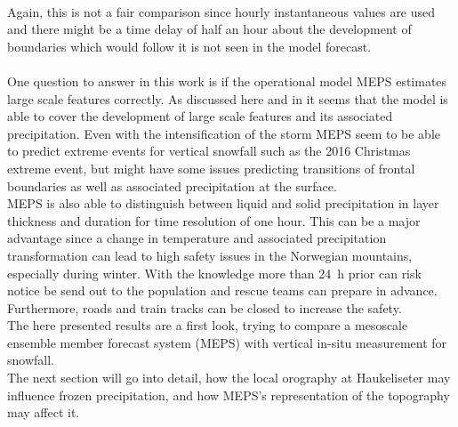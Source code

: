 \\
Again, this is not a fair comparison since hourly instantaneous values are used and there might be a time delay of half an hour about the development of boundaries which would follow it is not seen in the model forecast. 
\\
\\
One question to answer in this work is if the operational model MEPS estimates large scale features correctly. As discussed here and in  it seems that the model is able to cover the development of large scale features and its associated precipitation. Even with the intensification of the storm MEPS seem to be able to predict extreme events for vertical snowfall such as the 2016 Christmas extreme event, but might have some issues predicting transitions of frontal boundaries as well as associated precipitation at the surface. 
\\
MEPS is also able to distinguish between liquid and solid precipitation in layer thickness and duration for time resolution of one hour. This can be a major advantage since a change in temperature and associated precipitation transformation can lead to high safety issues in the Norwegian mountains, especially during winter. With the knowledge more than \SI{24}{\hour} prior can risk notice be send out to the population and rescue teams can prepare in advance. Furthermore, roads and train tracks can be closed to increase the safety. 
\\
The here presented results are a first look, trying to compare a mesoscale ensemble member forecast system (MEPS) with vertical in-situ measurement for snowfall.
\\
The next section will go into detail, how the local orography at Haukeliseter may influence frozen precipitation, and how MEPS's representation of the topography may affect it. 



